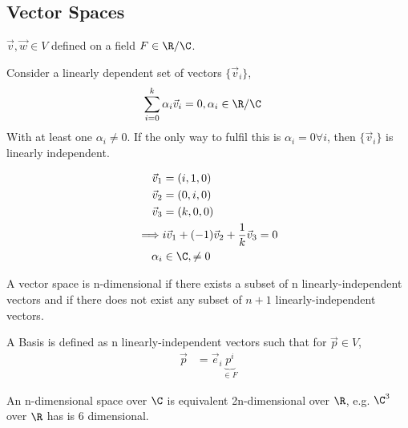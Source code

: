 \documentclass[cplx.tex]{subfiles}
\begin{document}
\chapter{}

\section{Vector Spaces}
$\vec{v},\vec{w} \in V$ defined on a field $F \in \R/\C$.

Consider a linearly dependent set of vectors $\{\vec{v}_i\}$,
\begin{align}
    \sum_{i=0}^k \alpha_i\vec{v}_i &= 0,\alpha_i \in \R/\C
\end{align}
With at least one $\alpha_i \neq 0$.
If the only way to fulfil this is $\alpha_i = 0 \forall i$, then $\{\vec{v}_i\}$ is linearly independent. 

\begin{example}[$\C^3$ on $\C$]
    \begin{align}
        \vec{v}_1 &= (i,1,0) \\
        \vec{v}_2 &= (0,i,0) \\
        \vec{v}_3 &= (k,0,0) \\
        \implies& i\vec{v}_1 + (-1)\vec{v}_2 + \frac{1}{k}\vec{v}_3 = 0 \\
        \alpha_i &\in \C, \neq 0
    \end{align}
\end{example}
A vector space is n-dimensional if there exists a subset of n linearly-independent vectors and if there does not exist any subset of $n+1$ linearly-independent vectors.

A Basis is defined as n linearly-independent vectors such that for $\vec{p} \in V$,
\begin{align}
    \vec{p} &= \vec{e}_i\underbrace{p^i}_{\in F}
\end{align}

An n-dimensional space over $\C$ is equivalent 2n-dimensional over $\R$, e.g. $\C^3$ over $\R$ has is 6 dimensional.
\end{document}
